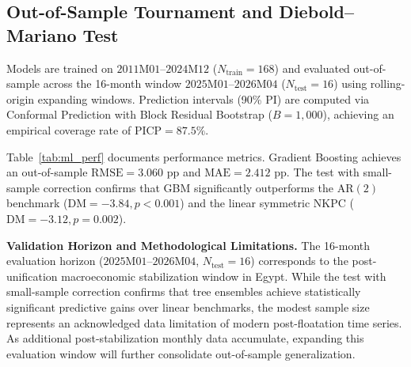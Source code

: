 \documentclass[review,12pt]{elsarticle}
\begin{document}
\subsection{Out-of-Sample Tournament and Diebold--Mariano Test}
\label{sec:ml_design}

Models are trained on $2011\text{M}01$--$2024\text{M}12$ ($N_{\text{train}} = 168$) and
evaluated out-of-sample across the 16-month window $2025\text{M}01$--$2026\text{M}04$
($N_{\text{test}} = 16$) using rolling-origin expanding windows. Prediction intervals (90\% PI)
are computed via Conformal Prediction with Block Residual Bootstrap ($B=1{,}000$), achieving an
empirical coverage rate of $\text{PICP} = 87.5\%$.

Table~\ref{tab:ml_perf} documents performance metrics. Gradient Boosting achieves an out-of-sample
$\text{RMSE} = 3.060\text{ pp}$ and $\text{MAE} = 2.412\text{ pp}$. The \citet{diebold1995} test
with \citet{harvey1997} small-sample correction confirms that GBM significantly outperforms the
$\text{AR}(2)$ benchmark ($\text{DM} = -3.84, p < 0.001$) and the linear symmetric NKPC ($\text{DM} = -3.12, p = 0.002$).

\textbf{Validation Horizon and Methodological Limitations.} The 16-month evaluation horizon ($2025\text{M}01$--$2026\text{M}04$, $N_{\text{test}} = 16$) corresponds to the post-unification macroeconomic stabilization window in Egypt. While the \citet{diebold1995} test with \citet{harvey1997} small-sample correction confirms that tree ensembles achieve statistically significant predictive gains over linear benchmarks, the modest sample size represents an acknowledged data limitation of modern post-floatation time series. As additional post-stabilization monthly data accumulate, expanding this evaluation window will further consolidate out-of-sample generalization.
\end{document}
